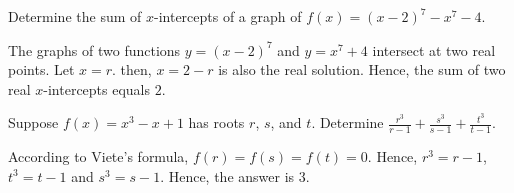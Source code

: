 \begin{problem}
Determine the sum of $x$-intercepts of a graph of $f(x)=(x-2)^7-x^7-4$.
\end{problem}

\begin{solution}
The graphs of two functions $y=(x-2)^7$ and $y=x^7+4$ intersect at two real points. Let $x=r$. then, $x=2-r$ is also the real solution. Hence, the sum of two real $x$-intercepts equals $2$. 
\end{solution}

\begin{problem}
Suppose $f(x)=x^3-x+1$ has roots $r$, $s$, and $t$. Determine $\frac{r^3}{r-1}+\frac{s^3}{s-1}+\frac{t^3}{t-1}$.
\end{problem}

\begin{solution}
According to Viete's formula, $f(r)=f(s)=f(t)=0$. Hence, $r^3=r-1$, $t^3=t-1$ and $s^3=s-1$. Hence, the answer is $3$.
\end{solution}